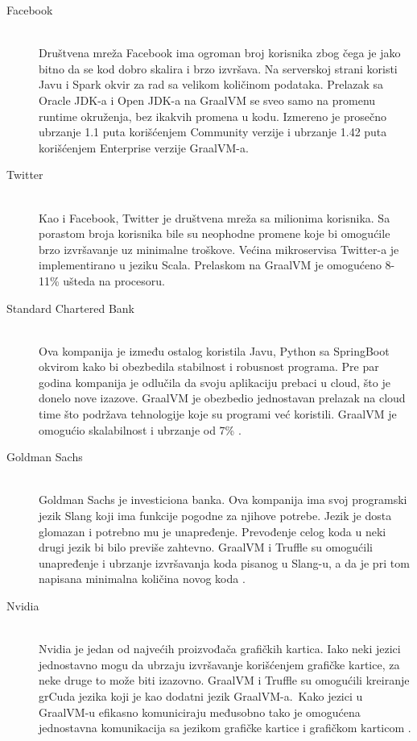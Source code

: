 \documentclass[a4paper]{article}
\begin{document}
\begin{description}
	\item[Facebook] \hfill \\
	Društvena mreža Facebook ima ogroman broj korisnika zbog čega je jako bitno da se kod dobro skalira i brzo izvršava.
	Na serverskoj strani koristi Javu i Spark okvir za rad sa velikom količinom podataka. Prelazak sa Oracle JDK-a i Open JDK-a na GraalVM se sveo samo na promenu runtime okruženja, bez ikakvih promena u kodu. Izmereno je prosečno ubrzanje 1.1 puta korišćenjem Community verzije i ubrzanje 1.42 puta korišćenjem Enterprise verzije GraalVM-a. \cite{graalvmusecases}
	
	\item[Twitter] \hfill \\
	Kao i Facebook, Twitter je društvena mreža sa milionima korisnika. Sa porastom broja korisnika bile su neophodne promene koje bi omogućile brzo izvršavanje uz minimalne troškove. Većina mikroservisa Twitter-a je implementirano u jeziku Scala. Prelaskom na GraalVM je omogućeno 8-11\% ušteda na procesoru. \cite{graalvmusecases}	
	
	\item[Standard Chartered Bank] \hfill \\
	Ova kompanija je između ostalog koristila Javu, Python sa SpringBoot okvirom kako bi obezbedila stabilnost i robusnost programa. Pre par godina kompanija je odlučila da svoju aplikaciju prebaci u cloud, što je donelo nove izazove. GraalVM je obezbedio jednostavan prelazak na cloud time što podržava tehnologije koje su programi već koristili. GraalVM je omogućio skalabilnost i ubrzanje od 7\% \cite{graalvmusecases}.
		
	\item[Goldman Sachs]  \hfill \\
        Goldman Sachs je investiciona banka. Ova kompanija ima svoj programski jezik Slang koji ima funkcije pogodne za njihove potrebe. Jezik je dosta glomazan i potrebno mu je unapređenje. Prevođenje celog koda u neki drugi jezik bi bilo previše zahtevno. GraalVM i Truffle su omogućili unapređenje i ubrzanje izvršavanja koda pisanog u Slang-u, a da je pri tom napisana minimalna količina novog koda \cite{graalvmusecases}.
	
	\item[Nvidia]  \hfill \\
	Nvidia je jedan od najvećih proizvođača grafičkih kartica. Iako neki jezici jednostavno mogu da ubrzaju izvršavanje korišćenjem grafičke kartice, za neke druge to može biti izazovno. GraalVM i Truffle su omogućili kreiranje grCuda jezika koji je kao dodatni jezik GraalVM-a.\ Kako jezici u GraalVM-u efikasno komuniciraju međusobno tako je omogućena jednostavna komunikacija sa jezikom grafičke kartice i grafičkom karticom \cite{graalvmusecases}.
	

\end{description}
\end{document}
